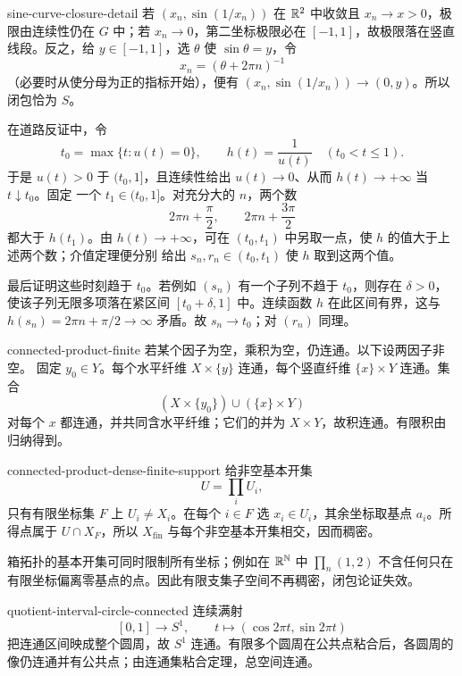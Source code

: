 \begin{solution}{sine-curve-closure-detail}
若 \((x_n,\sin(1/x_n))\) 在 \(\mathbb{R}^2\) 中收敛且 \(x_n\to x>0\)，极限由连续性仍在 \(G\) 中；若 \(x_n\to0\)，第二坐标极限必在 \([-1,1]\)，故极限落在竖直线段。反之，给 \(y\in[-1,1]\)，选 \(\theta\) 使 \(\sin\theta=y\)，令
\[
 x_n=(\theta+2\pi n)^{-1}
\]
（必要时从使分母为正的指标开始），便有 \((x_n,\sin(1/x_n))\to(0,y)\)。所以闭包恰为 \(S\)。

在道路反证中，令
\[
 t_0=\max\{t:u(t)=0\},\qquad h(t)=\frac1{u(t)}
 \quad(t_0<t\le1).
\]
于是 \(u(t)>0\) 于 \((t_0,1]\)，且连续性给出
\(u(t)\to0\)、从而 \(h(t)\to+\infty\) 当 \(t\downarrow t_0\)。固定
一个 \(t_1\in(t_0,1]\)。对充分大的 \(n\)，两个数
\[
 2\pi n+\frac\pi2,\qquad 2\pi n+\frac{3\pi}2
\]
都大于 \(h(t_1)\)。由 \(h(t)\to+\infty\)，可在
\((t_0,t_1)\) 中另取一点，使 \(h\) 的值大于上述两个数；介值定理便分别
给出 \(s_n,r_n\in(t_0,t_1)\) 使 \(h\) 取到这两个值。

最后证明这些时刻趋于 \(t_0\)。若例如 \((s_n)\) 有一个子列不趋于
\(t_0\)，则存在 \(\delta>0\)，使该子列无限多项落在紧区间
\([t_0+\delta,1]\) 中。连续函数 \(h\) 在此区间有界，这与
\(h(s_n)=2\pi n+\pi/2\to\infty\) 矛盾。故 \(s_n\to t_0\)；对
\((r_n)\) 同理。
\end{solution}

\begin{solution}{connected-product-finite}
若某个因子为空，乘积为空，仍连通。以下设两因子非空。
固定 \(y_0\in Y\)。每个水平纤维 \(X\times\{y\}\) 连通，每个竖直纤维 \(\{x\}\times Y\) 连通。集合
\[
 (X\times\{y_0\})\cup(\{x\}\times Y)
\]
对每个 \(x\) 都连通，并共同含水平纤维；它们的并为 \(X\times Y\)，故积连通。有限积由归纳得到。
\end{solution}

\begin{solution}{connected-product-dense-finite-support}
给非空基本开集
\[
 U=\prod_iU_i,
\]
只有有限坐标集 \(F\) 上 \(U_i\ne X_i\)。在每个 \(i\in F\) 选
\(x_i\in U_i\)，其余坐标取基点 \(a_i\)。所得点属于 \(U\cap X_F\)，所以 \(X_{\mathrm{fin}}\) 与每个非空基本开集相交，因而稠密。

箱拓扑的基本开集可同时限制所有坐标；例如在 \(\mathbb{R}^{\mathbb{N}}\) 中
\(\prod_n(1,2)\) 不含任何只在有限坐标偏离零基点的点。因此有限支集子空间不再稠密，闭包论证失效。
\end{solution}

\begin{solution}{quotient-interval-circle-connected}
连续满射
\[
 [0,1]\to S^1,\qquad t\mapsto(\cos2\pi t,\sin2\pi t)
\]
把连通区间映成整个圆周，故 \(S^1\) 连通。有限多个圆周在公共点粘合后，各圆周的像仍连通并有公共点；由连通集粘合定理，总空间连通。
\end{solution}

